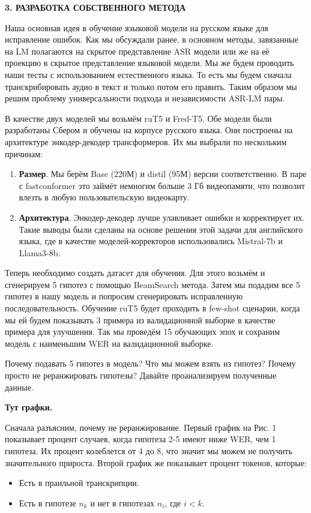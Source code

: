 \newpage
\begin{center}
  \textbf{\large 3. РАЗРАБОТКА СОБСТВЕННОГО МЕТОДА}
\end{center}

Наша основная идея в обучение языковой модели на русском языке для исправление ошибок.
Как мы обсуждали ранее, в основном методы, завязанные на LM полагаются на скрытое представление ASR модели или же на её проекцию в скрытое представление языковой модели.
Мы же будем проводить наши тесты с использованием естественного языка.
То есть мы будем сначала транскрибировать аудио в текст и только потом его править.
Таким образом мы решим проблему универсальности подхода и независимости ASR-LM пары.

В качестве двух моделей мы возьмём ruT5 и Fred-T5.
Обе модели были разработаны Сбером и обучены на корпусе русского языка.
Они построены на архитектуре энкодер-декодер трансформеров.
Их мы выбрали по нескольким причинам:

\begin{enumerate}
  \item \textbf{Размер}.
  Мы берём Base (220М) и distil (95М) версии соответственно. 
  В паре с fastconformer это займёт немногим больше 3 Гб видеопамяти, что позволит влезть в любую пользовательскую видеокарту.
  \item \textbf{Архитектура}.
  Энкодер-декодер лучше улавливает ошибки и корректирует их.
  Такие выводы были сделаны на основе решения этой задачи для английского языка, где в качестве моделей-корректоров использовались Mistral-7b и Llama3-8b.
\end{enumerate}

Теперь необходимо создать датасет для обучения.
Для этого возьмём и сгенерируем 5 гипотез с помощью BeamSearch метода.
Затем мы подадим все 5 гипотез в нашу модель и попросим сгенерировать исправленную последовательность.
Обучение ruT5 будет проходить в few-shot сценарии, когда мы ей будем показывать 3 примера из валидационной выборке в качестве примера для улучшения.
Так мы проведём 15 обучающих эпох и сохраним модель с наименьшим WER на валидационной выборке.

Почему подавать 5 гипотез в модель? Что мы можем взять из гипотез?
Почему просто не реранжировать гипотезы?
Давайте проанализируем полученные данные.

\textbf{Тут графки.}

Сначала разъясним, почему не реранжирование.
Первый график на Рис. 1 показывает процент случаев, когда гипотеза 2-5 имеют ниже WER, чем 1 гипотеза.
Их процент колеблется от 4 до 8, что значит мы можем не получить значительного прироста.
Второй график же показывает процент токенов, которые:
\begin{itemize}
  \item Есть в праильной транскрипции.
  \item Есть в гипотезе $n_k$ и нет в гипотезах $n_i$, где $i < k$.
\end{itemize}

